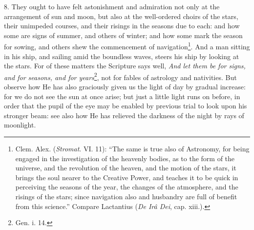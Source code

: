 8. They ought to have felt astonishment and admiration not only at the arrangement of sun and moon, but also at the well-ordered choirs of the stars, their unimpeded courses, and their risings in the seasons due to each: and how some are signs of summer, and others of winter; and how some mark the season for sowing, and others shew the commencement of navigation\footnote{Clem. Alex. (\emph{Stromat}. VI. 11): “The same is true also of Astronomy, for being engaged in the investigation of the heavenly bodies, as to the form of the universe, and the revolution of the heaven, and the motion of the stars, it brings the soul nearer to the Creative Power, and teaches it to be quick in perceiving the seasons of the year, the changes of the atmosphere, and the risings of the stars; since navigation also and husbandry are full of benefit from this science.” Compare Lactantius (\emph{De Irâ Dei}, cap. xiii.).}. And a man sitting in his ship, and sailing amid the boundless waves, steers his ship by looking at the stars. For of these matters the Scripture says well, \emph{And let them be for signs, and for seasons, and for years}\footnote{Gen. i. 14.}, not for fables of astrology and nativities. But observe how He has also graciously given us the light of day by gradual increase: for we do not see the sun at once arise; but just a little light runs on before, in order that the pupil of the eye may be enabled by previous trial to look upon his stronger beam: see also how He has relieved the darkness of the night by rays of moonlight.

